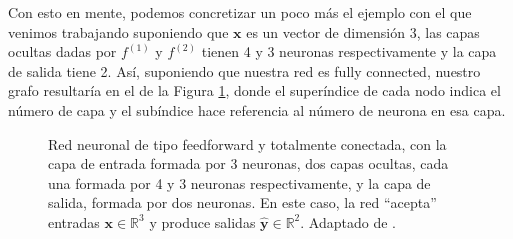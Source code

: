 \documentclass[../../main.tex]{subfiles}
\begin{document}
Con esto en mente, podemos concretizar un poco más el ejemplo con el que venimos
trabajando suponiendo que \(\bm{x}\) es un vector de dimensión 3, las capas ocultas dadas
por \(f^{(1)}\) y \(f^{(2)}\) tienen 4 y 3 neuronas respectivamente y la capa de salida
tiene 2. Así, suponiendo que nuestra red es fully connected, nuestro grafo resultaría en
el de la Figura \ref{fig:ff-neural-network}, donde el superíndice de cada nodo indica el
número de capa y el subíndice hace referencia al número de neurona en esa capa.
\begin{figure}
    \centering
    \caption{Red neuronal de tipo feedforward y totalmente conectada, con la capa de
    entrada formada por 3 neuronas, dos capas ocultas, cada una formada por 4 y 3 neuronas
    respectivamente, y la capa de salida, formada por dos neuronas. En este caso, la red
    ``acepta'' entradas \(\bm{x} \in \mathbb{R}^3\) y produce salidas \(\bm{\hat{y}} \in
    \mathbb{R}^2\). Adaptado de \cite{tikz-neural-networks}.}
    \label{fig:ff-neural-network}
\end{figure}
\end{document}
